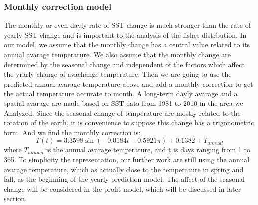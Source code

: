 \documentclass{mcmthesis}
\begin{document}
  
    
  \subsubsection{Monthly correction model}
    The monthly or even dayly rate of SST change is much stronger than the rate of yearly SST change and is important to the analysis of the fishes distrbution. In our model, we assume that the monthly change has a central value related to its annual avarage temperature. We also assume that the monthly change are determined by the seasonal change and independent of the factors which affect the yrarly change of avachange temperature. Then we are going to use the predicted annual avarage temperature above and add a monthly correction to get the actual temperature accurate to month. 
    A long-term dayly avarage and a spatial avarage are made based on SST data from 1981 to 2010 in the area we Analyzed. Since the seasonal change of temperature are mostly related to the rotation of the earth, it is convenience to suppose this change has a trigonometric form. And we find the monthly correction is: 
    \begin{equation}\label{}
      T(t)=3.3598\sin(-0.0184t+0.5921\pi)+0.1382+T_{annual}      
    \end{equation}
    where $T_{annual}$ is the annual avarage temperature, and t is days ranging from 1 to 365.
    To simplicity the representation, our further work are still using the annual avarage temperature, which as actually close to the temperature in spring and fall, as the beginning of the yearly prediction model. The affect of the seasonal change will be considered in the profit model, which will be discussed in later section. 
\end{document}
